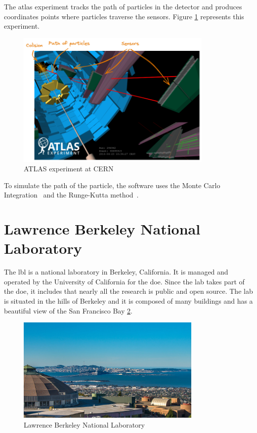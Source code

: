 The \acrfull{atlas} experiment tracks the path of particles in the detector and produces coordinates points where particles traverse the sensors.
Figure \ref{spec:fig:context:physics-simulation:lhc} represents this experiment.
\begin{figure}[ht]
    \centering
    \includegraphics[width=0.85\textwidth]{05-resources/img/spec/experiment-atlas.excalidraw.png}
    \caption{ATLAS experiment at CERN~\cite{atlas-experiment}}
    \label{spec:fig:context:physics-simulation:lhc}
\end{figure}

To simulate the path of the particle, the software uses the Monte Carlo Integration~\cite{Monte-Carlo-integration} and the Runge-Kutta method~\cite{Runge-Kutta-methods}.


\section{Lawrence Berkeley National Laboratory}
\label{spec:ch:context:lbl}

The \acrfull{lbl} is a national laboratory in Berkeley, California.
It is managed and operated by the University of California for the \acrfull{doe}.
Since the lab takes part of the \acrshort{doe}, it includes that nearly all the research is public and open source.
The lab is situated in the hills of Berkeley and it is composed of many buildings and has a beautiful view of the San Francisco Bay \ref{spec:fig:context:lbl:lab-view}.

\begin{figure}[ht]
    \centering
    \includegraphics[width=0.8\textwidth]{05-resources/img/spec/lab-view.jpg}
    \caption{Lawrence Berkeley National Laboratory}
    \label{spec:fig:context:lbl:lab-view}
\end{figure}



